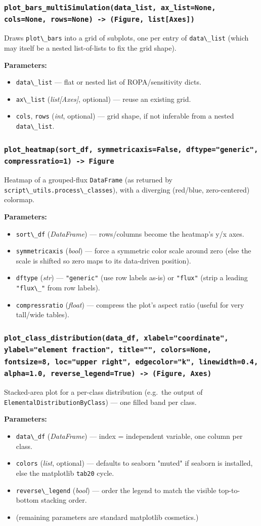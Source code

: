 \documentclass[11pt,a4paper]{report}
\newcommand{\pyfunc}[1]{\subsubsection{\texttt{#1}}}
\newenvironment{params}{\vspace{1mm}\noindent\textbf{Parameters:}\begin{itemize}[leftmargin=1.1cm,label={--},itemsep=1pt,topsep=2pt]}{\end{itemize}}
\newcommand{\pkg}[1]{\lstinline|#1|}
\begin{document}
\pyfunc{plot\_bars\_multiSimulation(data\_list, ax\_list=None, cols=None, rows=None) -> (Figure, list[Axes])}

Draws \pkg{plot\_bars} into a grid of subplots, one per entry of
\pkg{data\_list} (which may itself be a nested list-of-lists to fix the grid
shape).

\begin{params}
\item \pkg{data\_list} --- flat or nested list of ROPA/sensitivity dicts.
\item \pkg{ax\_list} (\textit{list[Axes]}, optional) --- reuse an existing
  grid.
\item \pkg{cols}, \pkg{rows} (\textit{int}, optional) --- grid shape, if not
  inferable from a nested \pkg{data\_list}.
\end{params}

\pyfunc{plot\_heatmap(sort\_df, symmetricaxis=False, dftype="generic", compressratio=1) -> Figure}

Heatmap of a grouped-flux \pkg{DataFrame} (as returned by
\pkg{script\_utils.process\_classes}), with a diverging (red/blue,
zero-centered) colormap.

\begin{params}
\item \pkg{sort\_df} (\textit{DataFrame}) --- rows/columns become the
  heatmap's y/x axes.
\item \pkg{symmetricaxis} (\textit{bool}) --- force a symmetric color scale
  around zero (else the scale is shifted so zero maps to its data-driven
  position).
\item \pkg{dftype} (\textit{str}) --- \pkg{"generic"} (use row labels as-is)
  or \pkg{"flux"} (strip a leading \pkg{"flux\_"} from row labels).
\item \pkg{compressratio} (\textit{float}) --- compress the plot's aspect
  ratio (useful for very tall/wide tables).
\end{params}

\pyfunc{plot\_class\_distribution(data\_df, xlabel="coordinate", ylabel="element fraction", title="", colors=None, fontsize=8, loc="upper right", edgecolor="k", linewidth=0.4, alpha=1.0, reverse\_legend=True) -> (Figure, Axes)}

Stacked-area plot for a per-class distribution (e.g.\ the output of
\pkg{ElementalDistributionByClass}) --- one filled band per class.

\begin{params}
\item \pkg{data\_df} (\textit{DataFrame}) --- index = independent variable,
  one column per class.
\item \pkg{colors} (\textit{list}, optional) --- defaults to seaborn
  "muted" if seaborn is installed, else the matplotlib \pkg{tab20} cycle.
\item \pkg{reverse\_legend} (\textit{bool}) --- order the legend to match
  the visible top-to-bottom stacking order.
\item (remaining parameters are standard matplotlib cosmetics.)
\end{params}
\end{document}
